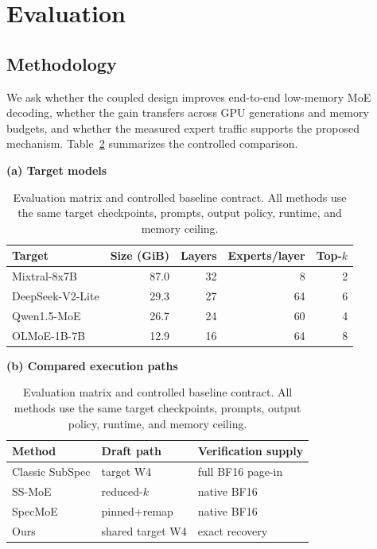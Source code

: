 \section{Evaluation}
\label{sec:evaluation}

\subsection{Methodology}

We ask whether the coupled design improves end-to-end low-memory MoE decoding, whether
the gain transfers across GPU generations and memory budgets, and whether the measured
expert traffic supports the proposed mechanism. Table~\ref{tab:setup-fairness}
summarizes the controlled comparison.

\begin{table}[t]
  \centering
  \caption{Evaluation matrix and controlled baseline contract. All methods use the
  same target checkpoints, prompts, output policy, runtime, and memory ceiling.}
  \label{tab:setup-fairness}
  \footnotesize
  \begin{minipage}[t]{0.51\textwidth}
  \textbf{(a) Target models}\\[-1pt]
  \begin{tabular*}{\linewidth}{@{\extracolsep{\fill}}lrrrr@{}}
    \toprule
    Target & Size (GiB) & Layers & Experts/layer & Top-$k$ \\
    \midrule
    Mixtral-8x7B & 87.0 & 32 & 8 & 2 \\
    DeepSeek-V2-Lite & 29.3 & 27 & 64 & 6 \\
    Qwen1.5-MoE & 26.7 & 24 & 60 & 4 \\
    OLMoE-1B-7B & 12.9 & 16 & 64 & 8 \\
    \bottomrule
  \end{tabular*}
  \end{minipage}%
  \hfill
  \begin{minipage}[t]{0.47\textwidth}
  \textbf{(b) Compared execution paths}\\[-1pt]
  \begin{tabular*}{\linewidth}{@{\extracolsep{\fill}}lll@{}}
    \toprule
    Method & Draft path & Verification supply \\
    \midrule
    Classic SubSpec & target W4 & full BF16 page-in \\
    SS-MoE & reduced-$k$ & native BF16 \\
    SpecMoE & pinned+remap & native BF16 \\
    Ours & shared target W4 & exact recovery \\
    \bottomrule
  \end{tabular*}
  \end{minipage}
\end{table}


